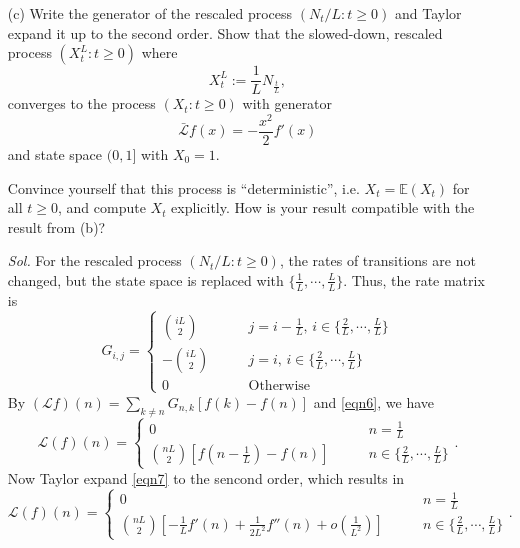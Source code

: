 \begin{enumerate}
    \item[(c)] Write the generator of the rescaled process $(N_t/L: t \ge 0)$ and Taylor expand it up to the second order. Show that the slowed-down, rescaled process $(X^L_t: t\ge 0)$ where 
    $$X^L_t := \frac{1}{L}N_{\frac{t}{L}},$$
    converges to the process $(X_t: t \ge 0)$ with generator 
    $$\bar{\mathcal{L}}f(x) = - \frac{x^2}{2} f'(x)$$
    and state space $(0, 1]$ with $X_0 = 1$.
    
    Convince yourself that this process is ``deterministic'', i.e. $X_t = \mathbb{E}(X_t)$ for all $t \ge 0$, and compute $X_t$ explicitly. How is your result compatible with the result from (b)?

    \textit{ Sol. } For the rescaled process $(N_t / L: t \ge 0)$, the rates of transitions are not changed, but the state space is replaced with $\{\frac{1}{L}, \cdots, \frac{L}{L}\}$. Thus, the rate matrix is 
    \begin{equation}\label{eqn6}
        G_{i,j} = \begin{cases}
            \binom{iL}{2} \qquad & j = i - \frac{1}{L}, \, i \in \{\frac{2}{L}, \cdots, \frac{L}{L}\} \\ 
            -\binom{iL}{2} \qquad & j = i, \, i \in \{\frac{2}{L}, \cdots, \frac{L}{L}\} \\ 
            0 \qquad & \text{Otherwise}
        \end{cases}
    \end{equation}
    By $(\mathcal{L}f)(n) = \sum_{k \neq n} G_{n,k} [f(k) - f(n)]$ and \eqref{eqn6}, we have 
    \begin{equation}\label{eqn7}
        \mathcal{L}(f)(n) = 
        \begin{cases}
            0 \qquad & n = \frac{1}{L} \\ 
            \binom{nL}{2} [f(n-\frac{1}{L}) - f(n)] \qquad & n \in \{\frac{2}{L}, \cdots, \frac{L}{L}\}
        \end{cases}.
    \end{equation}
    Now Taylor expand \eqref{eqn7} to the sencond order, which results in 
    \begin{equation*}
        \mathcal{L}(f)(n) = 
        \begin{cases}
            0 \qquad & n = \frac{1}{L} \\ 
            \binom{nL}{2} [-\frac{1}{L} f'(n) + \frac{1}{2L^2}f''(n) + o(\frac{1}{L^2})] \qquad & n \in \{\frac{2}{L}, \cdots, \frac{L}{L}\}
        \end{cases}.
    \end{equation*}


\end{enumerate}
